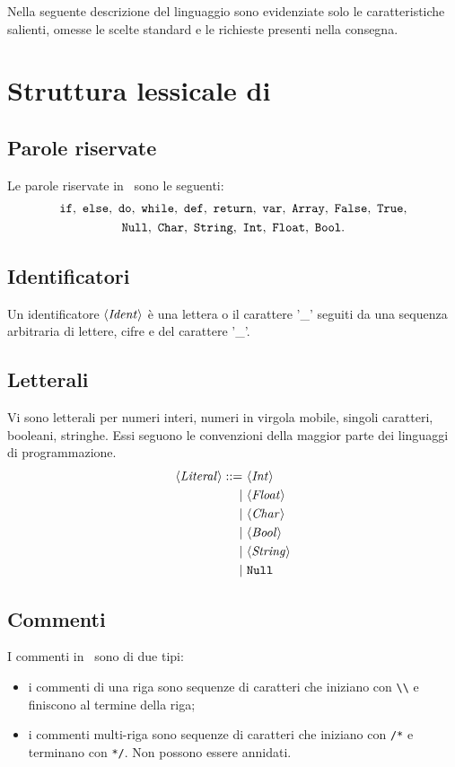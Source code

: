 
Nella seguente descrizione del linguaggio sono evidenziate solo le caratteristiche salienti, omesse le scelte standard e le richieste presenti nella consegna.

\section{Struttura lessicale di \SBF}

\subsection*{Parole riservate}
Le parole riservate in \SBF\ sono le seguenti:
\begin{gather*}
\If,\ \Else,\ \Do,\ \While,\ \Def,\ \Return,\ \Var,\ \texttt{Array},\ \False,\ \True,\\
\texttt{Null},\ \texttt{Char},\ \texttt{String},\ \texttt{Int},\ \texttt{Float},\ \texttt{Bool}.
\end{gather*}

\subsection*{Identificatori}

Un identificatore $\langle \mathit{Ident} \rangle$ è una lettera o il carattere '\_' seguiti da una sequenza arbitraria di lettere, cifre e del carattere '\_'.

\subsection*{Letterali}
Vi sono letterali per numeri interi, numeri in virgola mobile, singoli caratteri, booleani, stringhe. Essi seguono le convenzioni della maggior parte dei linguaggi di programmazione.
\begin{align*}
\token{Literal} ::=\ 
& \token{Int}\\
|\ & \token{Float}\\
|\ & \token{Char}\\
|\ & \token{Bool}\\
|\ & \token{String}\\
|\ & \texttt{Null}
\end{align*}

\subsection*{Commenti}
I commenti in \SBF\ sono di due tipi:
\begin{itemize}
	\item i commenti di una riga sono sequenze di caratteri che iniziano con \verb$\\$ e finiscono al termine della riga;
	\item i commenti multi-riga sono sequenze di caratteri che iniziano con \verb$/*$ e terminano con \verb$*/$. Non possono essere annidati.
\end{itemize}


